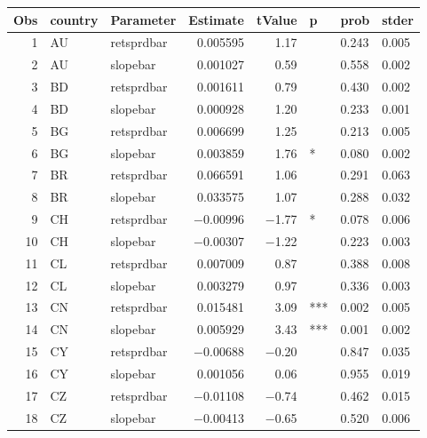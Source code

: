 

\begin{longtable}{|r|l|l|r|r|l|l|l|}\hline
   Obs &    country &    Parameter &    Estimate &    tValue &    p &    prob &    stder\\\hline
\endhead
   1 &    AU &    retsprdbar &    0.005595 &    1.17 &      &    0.243 &    0.005\\\hline
   2 &    AU &    slopebar &    0.001027 &    0.59 &      &    0.558 &    0.002\\\hline
   3 &    BD &    retsprdbar &    0.001611 &    0.79 &      &    0.430 &    0.002\\\hline
   4 &    BD &    slopebar &    0.000928 &    1.20 &      &    0.233 &    0.001\\\hline
   5 &    BG &    retsprdbar &    0.006699 &    1.25 &      &    0.213 &    0.005\\\hline
   6 &    BG &    slopebar &    0.003859 &    1.76 &    * &    0.080 &    0.002\\\hline
   7 &    BR &    retsprdbar &    0.066591 &    1.06 &      &    0.291 &    0.063\\\hline
   8 &    BR &    slopebar &    0.033575 &    1.07 &      &    0.288 &    0.032\\\hline
   9 &    CH &    retsprdbar &    $-$0.00996 &    $-$1.77 &    * &    0.078 &    0.006\\\hline
   10 &    CH &    slopebar &    $-$0.00307 &    $-$1.22 &      &    0.223 &    0.003\\\hline
   11 &    CL &    retsprdbar &    0.007009 &    0.87 &      &    0.388 &    0.008\\\hline
   12 &    CL &    slopebar &    0.003279 &    0.97 &      &    0.336 &    0.003\\\hline
   13 &    CN &    retsprdbar &    0.015481 &    3.09 &    *** &    0.002 &    0.005\\\hline
   14 &    CN &    slopebar &    0.005929 &    3.43 &    *** &    0.001 &    0.002\\\hline
   15 &    CY &    retsprdbar &    $-$0.00688 &    $-$0.20 &      &    0.847 &    0.035\\\hline
   16 &    CY &    slopebar &    0.001056 &    0.06 &      &    0.955 &    0.019\\\hline
   17 &    CZ &    retsprdbar &    $-$0.01108 &    $-$0.74 &      &    0.462 &    0.015\\\hline
   18 &    CZ &    slopebar &    $-$0.00413 &    $-$0.65 &      &    0.520 &    0.006\\\hline

\end{longtable}
